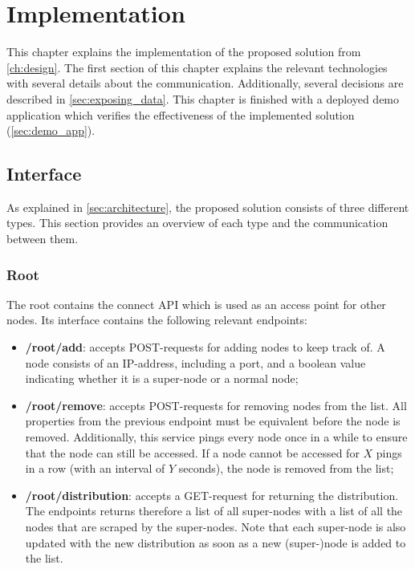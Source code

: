 \chapter{Implementation}\label{ch:implementation}
This chapter explains the implementation of the proposed solution from \autoref{ch:design}. The first section of this chapter explains the relevant technologies with several details about the communication. Additionally, several decisions are described in \autoref{sec:exposing_data}. This chapter is finished with a deployed demo application which verifies the effectiveness of the implemented solution (\autoref{sec:demo_app}).

\section{Interface} \label{sec:interface}
As explained in \autoref{sec:architecture}, the proposed solution consists of three different types. This section provides an overview of each type and the communication between them.

\subsection{Root} \label{sec:impl-root}
The root contains the connect API which is used as an access point for other nodes. Its interface contains the following relevant endpoints:

\begin{itemize}
    \item \textbf{/root/add}: accepts POST-requests for adding nodes to keep track of. A node consists of an IP-address, including a port, and a boolean value indicating whether it is a super-node or a normal node;
    \item \textbf{/root/remove}: accepts POST-requests for removing nodes from the list. All properties from the previous endpoint must be equivalent before the node is removed. Additionally, this service pings every node once in a while to ensure that the node can still be accessed. If a node cannot be accessed for $X$ pings in a row (with an interval of $Y$ seconds), the node is removed from the list;
    \item \textbf{/root/distribution}: accepts a GET-request for returning the distribution. The endpoints returns therefore a list of all super-nodes with a list of all the nodes that are scraped by the super-nodes. Note that each super-node is also updated with the new distribution as soon as a new (super-)node is added to the list. 
\end{itemize}

